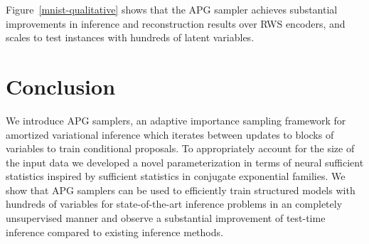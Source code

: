 \documentclass{article}
\theoremstyle{definition}
\begin{document}
Figure~\ref{mnist-qualitative} shows that the APG sampler achieves substantial improvements in inference and reconstruction results over RWS encoders, and scales to test instances with hundreds of latent variables.


\vspace{-1.0em}
\section{Conclusion}
We introduce APG samplers, an adaptive importance sampling framework for amortized variational inference which iterates between updates to blocks of variables to train conditional proposals. To appropriately account for the size of the input data we developed a novel parameterization in terms of neural sufficient statistics inspired by sufficient statistics in conjugate exponential families.
We show that APG samplers can be used to efficiently train structured models with hundreds of variables for state-of-the-art inference problems in an completely unsupervised manner and observe a substantial improvement of test-time inference compared to existing inference methods.


\end{document}
